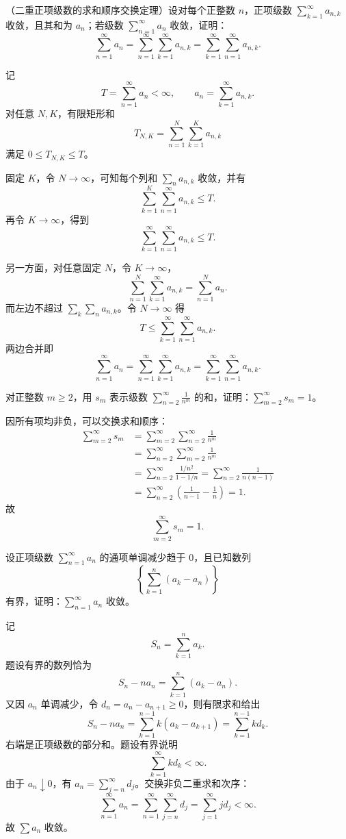 \begin{xreferenceproblem}[9]
（二重正项级数的求和顺序交换定理）设对每个正整数 $n$，正项级数 $\sum_{k=1}^{\infty}a_{n,k}$ 收敛，且其和为 $a_n$；若级数 $\sum_{n=1}^{\infty}a_n$ 收敛，证明：
\[
\sum_{n=1}^{\infty}a_n=\sum_{n=1}^{\infty}\sum_{k=1}^{\infty}a_{n,k}=\sum_{k=1}^{\infty}\sum_{n=1}^{\infty}a_{n,k}.
\]
\end{xreferenceproblem}
\begin{xsolution}
记
\[
 T=\sum_{n=1}^{\infty}a_n<\infty,
 \qquad
 a_n=\sum_{k=1}^{\infty}a_{n,k}.
\]
对任意 $N,K$，有限矩形和
\[
 T_{N,K}=\sum_{n=1}^{N}\sum_{k=1}^{K}a_{n,k}
\]
满足 $0\leq T_{N,K}\leq T$。

固定 $K$，令 $N\to\infty$，可知每个列和 $\sum_n a_{n,k}$ 收敛，并有
\[
 \sum_{k=1}^{K}\sum_{n=1}^{\infty}a_{n,k}\leq T.
\]
再令 $K\to\infty$，得到
\[
 \sum_{k=1}^{\infty}\sum_{n=1}^{\infty}a_{n,k}\leq T.
\]

另一方面，对任意固定 $N$，令 $K\to\infty$，
\[
 \sum_{n=1}^{N}\sum_{k=1}^{\infty}a_{n,k}
 =\sum_{n=1}^{N}a_n.
\]
而左边不超过 $\sum_k\sum_n a_{n,k}$。令 $N\to\infty$ 得
\[
 T\leq\sum_{k=1}^{\infty}\sum_{n=1}^{\infty}a_{n,k}.
\]
两边合并即
\[
 \boxed{
 \sum_{n=1}^{\infty}a_n
 =\sum_{n=1}^{\infty}\sum_{k=1}^{\infty}a_{n,k}
 =\sum_{k=1}^{\infty}\sum_{n=1}^{\infty}a_{n,k}.}
\]
\end{xsolution}


\begin{xreferenceproblem}[10]
对正整数 $m\geq2$，用 $s_m$ 表示级数 $\sum_{n=2}^{\infty}\frac1{n^m}$ 的和，证明：$\sum_{m=2}^{\infty}s_m=1$。
\end{xreferenceproblem}
\begin{xsolution}
因所有项均非负，可以交换求和顺序：
\[
 \begin{aligned}
 \sum_{m=2}^{\infty}s_m
 &=\sum_{m=2}^{\infty}\sum_{n=2}^{\infty}\frac1{n^m}\\
 &=\sum_{n=2}^{\infty}\sum_{m=2}^{\infty}\frac1{n^m}\\
 &=\sum_{n=2}^{\infty}\frac{1/n^2}{1-1/n}
 =\sum_{n=2}^{\infty}\frac1{n(n-1)}\\
 &=\sum_{n=2}^{\infty}\left(\frac1{n-1}-\frac1n\right)=1.
 \end{aligned}
\]
故
\[
 \boxed{\sum_{m=2}^{\infty}s_m=1.}
\]
\end{xsolution}


\begin{xreferenceproblem}[11]
设正项级数 $\sum_{n=1}^{\infty}a_n$ 的通项单调减少趋于 0，且已知数列
\[
\left\{\sum_{k=1}^{n}(a_k-a_n)\right\}
\]
有界，证明：$\sum_{n=1}^{\infty}a_n$ 收敛。
\end{xreferenceproblem}
\begin{xsolution}
记
\[
 S_n=\sum_{k=1}^{n}a_k.
\]
题设有界的数列恰为
\[
 S_n-na_n
 =\sum_{k=1}^{n}(a_k-a_n).
\]
又因 $a_n$ 单调减少，令 $d_n=a_n-a_{n+1}\geq0$，则有限求和给出
\[
 S_n-na_n=\sum_{k=1}^{n-1}k(a_k-a_{k+1})
 =\sum_{k=1}^{n-1}kd_k.
\]
右端是正项级数的部分和。题设有界说明
\[
 \sum_{k=1}^{\infty}kd_k<\infty.
\]
由于 $a_n\downarrow0$，有 $a_n=\sum_{j=n}^{\infty}d_j$。交换非负二重求和次序：
\[
 \sum_{n=1}^{\infty}a_n
 =\sum_{n=1}^{\infty}\sum_{j=n}^{\infty}d_j
 =\sum_{j=1}^{\infty}j d_j<\infty.
\]
故 $\sum a_n$ 收敛。
\end{xsolution}



